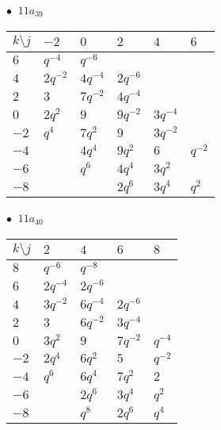 \begin{minipage}{\linewidth}
$\bullet\ $ $11a_{39}$ \vspace{0.5em} \\
\begin{tabular}{l|lllll}
$k \setminus j$ & $-2$ & $0$ & $2$ & $4$ & $6$ \\
\hline
$6$ & $q^{-4}$ & $q^{-6}$ &  &  &  \\
$4$ & $2q^{-2}$ & $4q^{-4}$ & $2q^{-6}$ &  &  \\
$2$ & $3$ & $7q^{-2}$ & $4q^{-4}$ &  &  \\
$0$ & $2q^{2}$ & $9$ & $9q^{-2}$ & $3q^{-4}$ &  \\
$-2$ & $q^{4}$ & $7q^{2}$ & $9$ & $3q^{-2}$ &  \\
$-4$ &  & $4q^{4}$ & $9q^{2}$ & $6$ & $q^{-2}$ \\
$-6$ &  & $q^{6}$ & $4q^{4}$ & $3q^{2}$ &  \\
$-8$ &  &  & $2q^{6}$ & $3q^{4}$ & $q^{2}$ \\
\end{tabular}
\vspace{2em}
\end{minipage}
%
\begin{minipage}{\linewidth}
$\bullet\ $ $11a_{40}$ \vspace{0.5em} \\
\begin{tabular}{l|llll}
$k \setminus j$ & $2$ & $4$ & $6$ & $8$ \\
\hline
$8$ & $q^{-6}$ & $q^{-8}$ &  &  \\
$6$ & $2q^{-4}$ & $2q^{-6}$ &  &  \\
$4$ & $3q^{-2}$ & $6q^{-4}$ & $2q^{-6}$ &  \\
$2$ & $3$ & $6q^{-2}$ & $3q^{-4}$ &  \\
$0$ & $3q^{2}$ & $9$ & $7q^{-2}$ & $q^{-4}$ \\
$-2$ & $2q^{4}$ & $6q^{2}$ & $5$ & $q^{-2}$ \\
$-4$ & $q^{6}$ & $6q^{4}$ & $7q^{2}$ & $2$ \\
$-6$ &  & $2q^{6}$ & $3q^{4}$ & $q^{2}$ \\
$-8$ &  & $q^{8}$ & $2q^{6}$ & $q^{4}$ \\
\end{tabular}
\vspace{2em}
\end{minipage}
%
